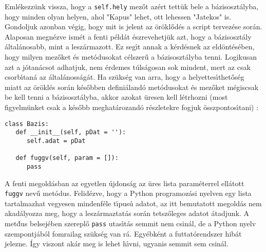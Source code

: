 Eml\'ekezz\"unk vissza, hogy a {\tt self.hely} mez\H{o}t az\'ert tett\"uk bele a b\'azisoszt\'alyba, hogy minden olyan 
helyen, ahol "Kapus" lehet, ott lehessen "Jatekos" is. Gondoljuk azonban v\'egig, hogy mit is jelent az \"or\"okl\H{o}d\'es 
a script tervez\'ese sor\'an. Alaposan megn\'ezve ism\'et a fenti p\'eld\'at \'eszrevehetj\"uk azt, hogy a b\'azisoszt\'aly 
\'altal\'anosabb, mint a lesz\'armazott. Ez seg\'{\i}t annak a k\'erd\'esnek az eld\"ont\'es\'eben, hogy milyen mez\H{o}ket 
\'es met\'odusokat c\'elszer\H{u} a b\'azisoszt\'alyba tenni. Logikusan azt a j\'otan\'acsot adhatjuk, nem \'erdemes 
t\'uls\'agosan sok mindent, mert az csak csorb\'{\i}tan\'a az \'altal\'anoss\'ag\'at. Ha sz\"uks\'eg van arra, hogy a 
helyettes\'{\i}thet\H{o}s\'eg miatt az \"or\"okl\'es sor\'an k\'es\H{o}bben defini\'aland\'o met\'odusokat \'es mez\H{o}ket 
m\'egiscsak be kell tenni a b\'azisoszt\'alyba, akkor azokat \"uresen kell l\'etrhozni (most figyelm\"unket csak a k\'es\H{o}bb 
meghat\'arozand\'o r\'eszletekre fogjuk \"osszpontos\'{\i}tani) :

\begin{Verbatim}[fontsize=\small]
class Bazis:
   def __init__(self, pDat = ''):
      self.adat = pDat

   def fuggv(self, param = []):
      pass

\end{Verbatim}

A fenti megold\'asban az egyetlen \'ujdons\'ag az \"ures lista param\'eterrel ell\'atott {\tt fuggv} nev\H{u} met\'odus. 
Felid\'ezve, hogy a Python programoz\'asi nyelven egy lista tartalmazhat vegyesen mindenf\'ele t\'{\i}pus\'u adatot, az itt 
bemutatott megold\'as nem akad\'alyozza meg, hogy a lesz\'armaztat\'as sor\'an tetsz\H{o}leges adatot \'atadjunk. A 
met\'{dus} belsej\'eben szerepl\H{o} {\tt pass} utas\'{\i}t\'as semmit nem csin\'al, de a Python nyelv szempontj\'ab\'ol 
fomrailag sz\"uks\'eg van r\'a. Egy\'ebk\'ent a futtat\'orendszer hib\'at jelezne. \'Igy viszont ak\'ar meg is lehet 
h\'{\i}vni, ugyanis semmit sem csin\'al. 




